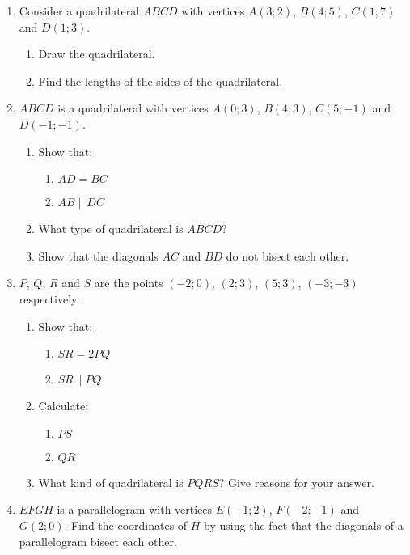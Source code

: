 \begin{eocexercises}{}
\begin{enumerate}[noitemsep, label=\textbf{\arabic*}. ]
  \item Consider a quadrilateral $ABCD$ with vertices $A(3;2)$, $B(4;5)$, $C(1;7)$ and $D(1;3)$.
    \begin{enumerate}[noitemsep, label=\textbf{(\alph*)} ]
    \item  Draw the quadrilateral.
    \item  Find the lengths of the sides of the quadrilateral.
    \end{enumerate}
  \item $ABCD$ is a quadrilateral with vertices $A(0;3)$, $B(4;3)$, $C(5;-1)$ and $D(-1;-1)$.
    \begin{enumerate}[noitemsep, label=\textbf{(\alph*)} ]
    \item Show that:
      \begin{enumerate}[noitemsep, label=\textbf{\roman*}. ] 
      \item $AD = BC$
      \item $AB \parallel DC$
      \end{enumerate}
    \item What type of quadrilateral is $ABCD$?
    \item Show that the diagonals $AC$ and $BD$ do not bisect each other.
    \end{enumerate}
  \item $P$, $Q$, $R$ and $S$ are the points $(-2;0)$, $(2;3)$, $(5;3)$, $(-3;-3)$ respectively.
    \begin{enumerate}[noitemsep, label=\textbf{(\alph*)} ]
    \item Show that:
      \begin{enumerate}[noitemsep, label=\textbf{\roman*}. ] 
      \item $SR = 2PQ$
      \item $SR \parallel PQ$
      \end{enumerate}
    \item Calculate:
      \begin{enumerate}[noitemsep, label=\textbf{\roman*}. ] 
      \item $PS$
      \item $QR$
      \end{enumerate}
    \item What kind of quadrilateral is $PQRS$? Give reasons for your answer.
    \end{enumerate}
  \item $EFGH$ is a parallelogram with vertices $E(-1;2)$, $F(-2;-1)$ and $G(2;0)$. Find the coordinates of $H$ by using the fact that the diagonals of a parallelogram bisect each other.

\end{enumerate}
\end{eocexercises}
